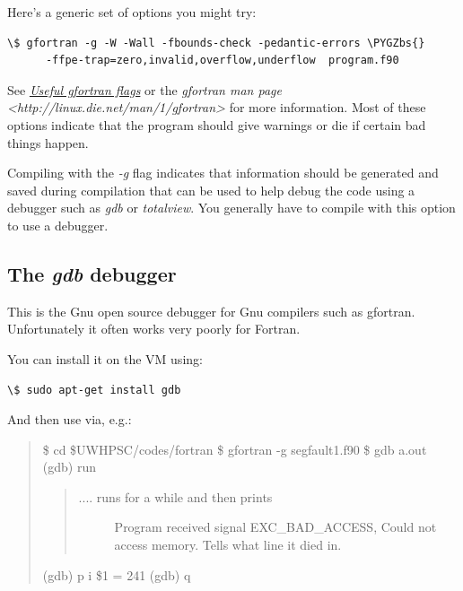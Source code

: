 \documentclass[letterpaper,10pt,english]{sphinxmanual}
\def\PYGZbs{\char`\\}
\begin{document}
Here's a generic set of options you might try:

\begin{Verbatim}[commandchars=\\\{\}]
\$ gfortran -g -W -Wall -fbounds-check -pedantic-errors \PYGZbs{}
      -ffpe-trap=zero,invalid,overflow,underflow  program.f90
\end{Verbatim}

See {\hyperref[gfortran_flags:gfortran-flags]{\emph{Useful gfortran flags}}} or the
\emph{gfortran man page \textless{}http://linux.die.net/man/1/gfortran\textgreater{}}
for more information.  Most of these options
indicate that the program should give warnings or die if certain bad things
happen.

Compiling with the \emph{-g} flag indicates that information should be
generated and saved during compilation that can be used to help debug the
code using a debugger such as \emph{gdb} or \emph{totalview}.  You generally have to
compile with this option to use a debugger.


\subsection{The \emph{gdb} debugger}
\label{fortran_debugging:the-gdb-debugger}
This is the Gnu open source debugger for Gnu compilers such as gfortran.
Unfortunately it often works very poorly for Fortran.

You can install it on the VM using:

\begin{Verbatim}[commandchars=\\\{\}]
\$ sudo apt-get install gdb
\end{Verbatim}

And then use via, e.g.:
\begin{quote}

\$ cd \$UWHPSC/codes/fortran
\$ gfortran -g segfault1.f90
\$ gdb a.out
(gdb) run
\begin{quote}
\begin{description}
\item[{.... runs for a while and then prints}] \leavevmode
Program received signal EXC\_BAD\_ACCESS, Could not access memory.
Tells what line it died in.

\end{description}
\end{quote}

(gdb) p i
\$1 = 241
(gdb) q
\end{quote}
\end{document}
